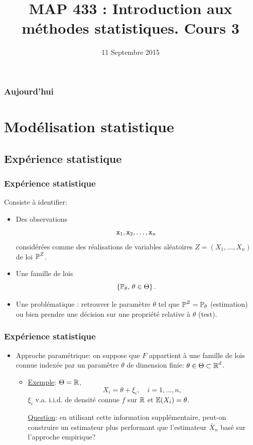 
\title{MAP 433 : Introduction aux méthodes statistiques. Cours 3}

\date{11 Septembre 2015}
\maketitle



\begin{frame}
\frametitle{Aujourd'hui}
\tableofcontents
\end{frame}
\section{Modélisation statistique}
\subsection{Expérience statistique}
\begin{frame}
\frametitle{Expérience statistique} Consiste à identifier:
\begin{itemize}
\item \alert{Des observations}
$${\tt x}_1,{\tt x}_2,\ldots, {\tt x}_n$$
\alert{considérées} comme des \alert{ réalisations} de variables aléatoires $Z = (X_1,\ldots, X_n)$ de loi $\operatorname{{\mathbb P}}^Z$.
\item \alert{Une famille de lois}
$$\left\{\operatorname{{\mathbb P}}_\theta,\,\theta \in \Theta\right\}.$$
\item \alert{Une problématique} : retrouver le paramètre
$\theta$ tel que $\operatorname{{\mathbb P}}^Z=\operatorname{{\mathbb P}}_\theta$ (estimation) ou bien prendre une décision sur une propriété relative à $\theta$ (test).
\end{itemize}
\end{frame}

\begin{frame}
\frametitle{Expérience statistique}
\begin{itemize}
\item Approche param\'etrique: \alert{ on suppose} que $F$ appartient \`a une
\alert{ famille de lois connue} index\'ee par un param\`etre
$\theta$ de dimension finie: $\theta\in \Theta \subset \operatorname{{\mathbb R}}^d$.
\begin{itemize}
\item \underline{Exemple}: $\Theta = \operatorname{{\mathbb R}}$,
$$ X_i= \theta +\xi_i, \quad i=1,\dots,n,$$
$\xi_i$ v.a. i.i.d. de densit\'e \alert{ connue} $f$ sur $\operatorname{{\mathbb R}}$
et $\operatorname{{\mathbb E}}(X_i)=\theta$.

\underline{Question}: en utilisant cette information
suppl\'ementaire, peut-on construire un estimateur plus performant
que l'estimateur $\bar X_n$ bas\'e sur l'approche empirique?
\end{itemize}
%
\end{itemize}
\end{frame}


